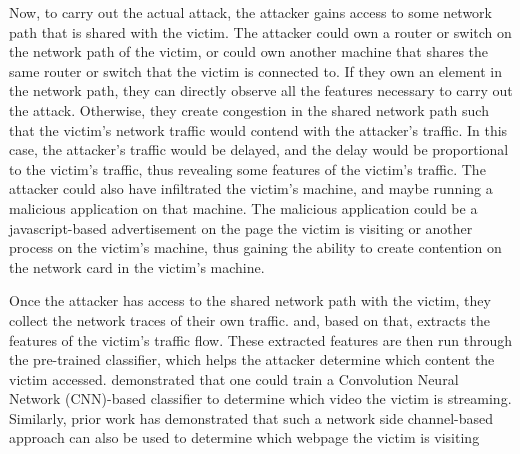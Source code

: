 Now, to carry out the actual attack, the attacker gains access to some network path that is shared with the victim.
The attacker could own a router or switch on the network path of the victim, or could own another machine that shares the same router or switch that the victim is connected to.
If they own an element in the network path, they can directly observe all the features necessary to carry out the attack. 
Otherwise, they create congestion in the shared network path such that the victim's network traffic would contend with the attacker's traffic.
In this case, the attacker's traffic would be delayed, and the delay would be proportional to the victim's traffic, thus revealing some features of the victim's traffic.
The attacker could also have infiltrated the victim's machine, and maybe running a malicious application on that machine.
The malicious application could be a javascript-based advertisement on the page the victim is visiting or another process on the victim's machine, thus gaining the ability to create contention on the network card in the victim's machine. 


Once the attacker has access to the shared network path with the victim, they collect the network traces of their own traffic. and, based on that, extracts the features of the victim's traffic flow.
These extracted features are then run through the pre-trained classifier, which helps the attacker determine which content the victim accessed. 
\citet{schuster2017beautyburst} demonstrated that one could train a Convolution Neural Network (CNN)-based classifier to determine which video the victim is streaming.
Similarly, prior work has demonstrated that such a network side channel-based approach can also be used to determine which webpage the victim is visiting \cite{hayes2016kfp, panchenko2016website, gong2010fingerprinting}


